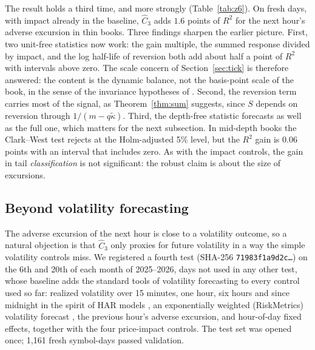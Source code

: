 \documentclass[12pt]{article}
\theoremstyle{definition}
\theoremstyle{remark}
\begin{document}
The result holds a third time, and more strongly (Table~\ref{tab:z6}). On fresh days, with impact already in the baseline, $\hat C_3$ adds $1.6$ points of $R^2$ for the next hour's adverse excursion in thin books. Three findings sharpen the earlier picture. First, two unit-free statistics now work: the gain multiple, the summed response divided by impact, and the log half-life of reversion both add about half a point of $R^2$ with intervals above zero. The scale concern of Section~\ref{sec:tick} is therefore answered: the content is the dynamic balance, not the basis-point scale of the book, in the sense of the invariance hypotheses of \citet{kyle2016}. Second, the reversion term carries most of the signal, as Theorem~\ref{thm:sum} suggests, since $S$ depends on reversion through $1/(m-q\tilde\kappa)$. Third, the depth-free statistic forecasts as well as the full one, which matters for the next subsection. In mid-depth books the Clark--West test rejects at the Holm-adjusted 5\% level, but the $R^2$ gain is $0.06$ points with an interval that includes zero. As with the impact controls, the gain in tail \emph{classification} is not significant: the robust claim is about the size of excursions.

\subsection{Beyond volatility forecasting}\label{sec:z9}
The adverse excursion of the next hour is close to a volatility outcome, so a natural objection is that $\hat C_3$ only proxies for future volatility in a way the simple volatility controls miss. We registered a fourth test (SHA-256 \texttt{71983f1a9d2c\ldots}) on the 6th and 20th of each month of 2025--2026, days not used in any other test, whose baseline adds the standard tools of volatility forecasting to every control used so far: realized volatility over 15 minutes, one hour, six hours and since midnight in the spirit of HAR models \citep{corsi2009}, an exponentially weighted (RiskMetrics) volatility forecast \citep{riskmetrics1996}, the previous hour's adverse excursion, and hour-of-day fixed effects, together with the four price-impact controls. The test set was opened once; 1{,}161 fresh symbol-days passed validation.
\end{document}
